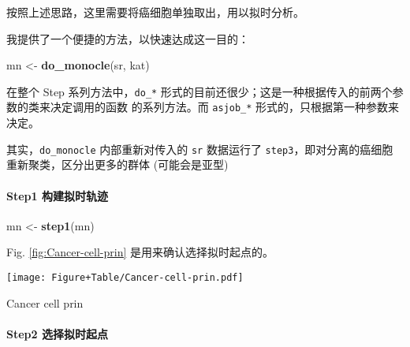 \documentclass[
]{article}
\newenvironment{Shaded}{\begin{snugshade}}{\end{snugshade}}
\newcommand{\CommentTok}[1]{\textcolor[rgb]{0.56,0.35,0.01}{\textit{#1}}}
\newcommand{\DecValTok}[1]{\textcolor[rgb]{0.00,0.00,0.81}{#1}}
\newcommand{\KeywordTok}[1]{\textcolor[rgb]{0.13,0.29,0.53}{\textbf{#1}}}
\newcommand{\NormalTok}[1]{#1}
\newcommand{\OperatorTok}[1]{\textcolor[rgb]{0.81,0.36,0.00}{\textbf{#1}}}
\newcommand{\StringTok}[1]{\textcolor[rgb]{0.31,0.60,0.02}{#1}}
\begin{document}
按照上述思路，这里需要将癌细胞单独取出，用以拟时分析。

我提供了一个便捷的方法，以快速达成这一目的：

\begin{Shaded}
\begin{Highlighting}[]
\NormalTok{mn \textless{}{-}}\StringTok{ }\KeywordTok{do\_monocle}\NormalTok{(sr, kat)}
\end{Highlighting}
\end{Shaded}

在整个 Step 系列方法中，\texttt{do\_*} 形式的目前还很少；这是一种根据传入的前两个参数的类来决定调用的函数
的系列方法。而 \texttt{asjob\_*} 形式的，只根据第一种参数来决定。

其实，\texttt{do\_monocle} 内部重新对传入的 \texttt{sr} 数据运行了 \texttt{step3}，即对分离的癌细胞重新聚类，区分出更多的群体 (可能会是亚型)

\hypertarget{step1-ux6784ux5efaux62dfux65f6ux8f68ux8ff9}{%
\paragraph{Step1 构建拟时轨迹}\label{step1-ux6784ux5efaux62dfux65f6ux8f68ux8ff9}}

\begin{Shaded}
\begin{Highlighting}[]
\NormalTok{mn \textless{}{-}}\StringTok{ }\KeywordTok{step1}\NormalTok{(mn)}
\end{Highlighting}
\end{Shaded}

Fig. \ref{fig:Cancer-cell-prin} 是用来确认选择拟时起点的。

\begin{Shaded}
\end{Shaded}

\def\@captype{figure}
\begin{center}
\texttt{[image: Figure+Table/Cancer-cell-prin.pdf]}
\caption{Cancer cell prin}\label{fig:Cancer-cell-prin}
\end{center}

\hypertarget{step2-ux9009ux62e9ux62dfux65f6ux8d77ux70b9}{%
\paragraph{Step2 选择拟时起点}\label{step2-ux9009ux62e9ux62dfux65f6ux8d77ux70b9}}
\end{document}
